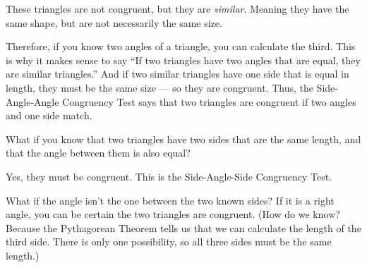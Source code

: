 These triangles are not congruent, but they are \emph{similar}. Meaning
 they have the same shape, but are not necessarily the same
size.

Therefore, if you know two angles of a triangle, you can calculate the third. This is why it makes sense
to say ``If two triangles have two angles that are equal, they are
similar triangles.''  And if two similar triangles have one side that
is equal in length, they must be the same size --- so they are
congruent. Thus, the Side-Angle-Angle Congruency Test says that
two triangles are congruent if two angles and one side match.

What if you know that two triangles have two sides that are the same
length, and that the angle between them is also equal?


Yes, they must be congruent. This is the Side-Angle-Side Congruency Test.

What if the angle isn't the one between the two known sides? If it is
a right angle, you can be certain the two triangles are congruent.
(How do we know? Because the Pythagorean Theorem tells us that we can
calculate the length of the third side. There is only one possibility,
so all three sides must be the same length.)

